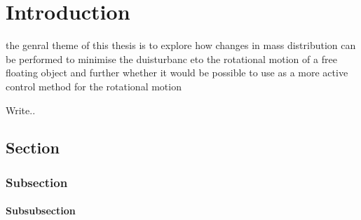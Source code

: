 
\chapter{Introduction}
\label{ch:introduction}

the genral theme of this thesis is to explore how changes in mass distribution can be performed to minimise the duisturbanc eto the rotational motion of a free floating object and further whether it would be possible to use as a more active control method for the rotational motion

Write..
\section{Section}

\cite{ghc-pps}

\subsection{Subsection}

\subsubsection{Subsubsection}